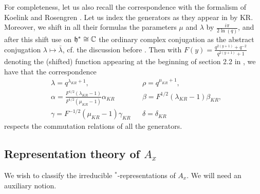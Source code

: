 



For completeness, let us also recall the correspondence with the formalism of Koelink and Rosengren \cite{KoR1}. Let us index the generators as they appear in \cite[Definition 2.6]{KoR1} by KR. Moreover, we shift in all their formulas the parameters $\mu$ and $\lambda$ by $\frac{i\pi}{2\ln(q)}$, and after this shift use on $\mathfrak{h}^* \cong \mathbb{C}$ the ordinary complex conjugation as the abstract conjugation $\lambda \mapsto \bar{\lambda}$, cf. the discussion before \cite[Definition 2.8]{KoR1}. Then with $F(y) = \frac{q^{2(y+1)}+q^{-2}}{q^{2(y+1)}+1}$ denoting the (shifted) function appearing at the beginning of section 2.2 in \cite{KoR1}, we have that the correspondence \begin{align*} &\lambda = q^{\lambda_{KR}+1},&& \rho = q^{\mu_{KR}+1},\\ &\alpha = \frac{F^{1/2}(\lambda_{KR}-1)}{F^{1/2}(\mu_{KR}-1)}\alpha_{KR}&& \beta = F^{1/2}(\lambda_{KR}-1)\beta_{KR},\\ &\gamma = F^{-1/2}(\mu_{KR}-1)\gamma_{KR}&& \delta = \delta_{KR}\end{align*} respects the commutation relations of all the generators. 


\subsection{Representation theory of $A_x$}


We wish to classify the irreducible $^*$-representations of $A_x$. We will need an auxiliary notion.



